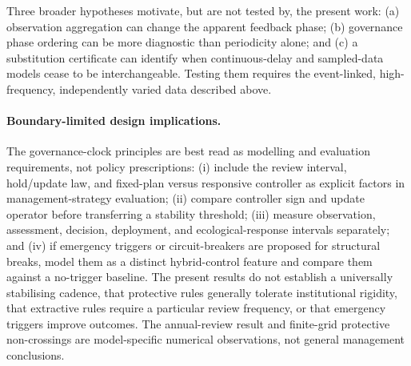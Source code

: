 Three broader hypotheses motivate, but are not tested by, the present work: (a) observation aggregation can change the apparent feedback phase; (b) governance phase ordering can be more diagnostic than periodicity alone; and (c) a substitution certificate can identify when continuous-delay and sampled-data models cease to be interchangeable. Testing them requires the event-linked, high-frequency, independently varied data described above.

\paragraph{Boundary-limited design implications.} The governance-clock principles are best read as modelling and evaluation requirements, not policy prescriptions: (i) include the review interval, hold/update law, and fixed-plan versus responsive controller as explicit factors in management-strategy evaluation; (ii) compare controller sign and update operator before transferring a stability threshold; (iii) measure observation, assessment, decision, deployment, and ecological-response intervals separately; and (iv) if emergency triggers or circuit-breakers are proposed for structural breaks, model them as a distinct hybrid-control feature and compare them against a no-trigger baseline. The present results do not establish a universally stabilising cadence, that protective rules generally tolerate institutional rigidity, that extractive rules require a particular review frequency, or that emergency triggers improve outcomes. The annual-review result and finite-grid protective non-crossings are model-specific numerical observations, not general management conclusions.


